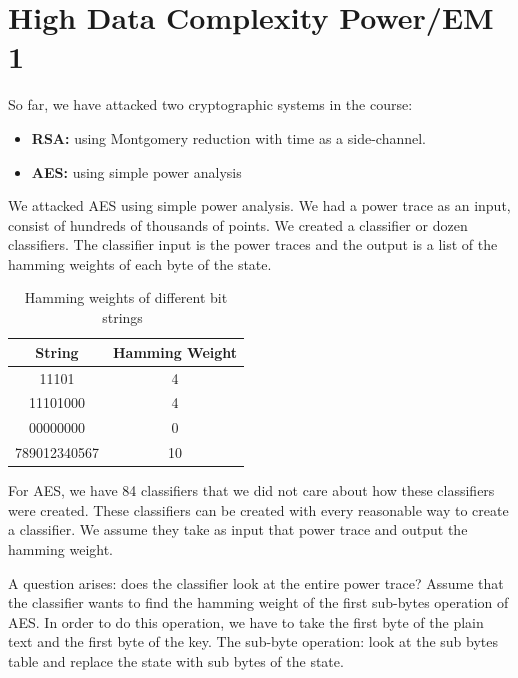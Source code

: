 \chapter{High Data Complexity Power/EM 1} \label{cha:High Data Complexity Power/EM 1}

\newcommand{\hodaya}[1]{{\textcolor{blue}{[Hodaya: #1]}}}

So far, we have attacked two cryptographic systems in the course:
\begin{itemize}
    \item \textbf{RSA:} using Montgomery reduction with time as a side-channel.
    \item \textbf{AES:} using simple power analysis
\end{itemize}

We attacked AES using simple power analysis.
We had a power trace as an input, consist of hundreds of thousands of points.
We created a classifier or dozen classifiers.
The classifier input is the power traces and the output is a list of the hamming weights of each byte of the state.

\begin{table}
    \caption{Hamming weights of different bit strings~\cite{hamming}}\label{hammingWeights}
    \begin{center}
    \begin{tabular}{ cc }
        \toprule
        String & Hamming Weight \\ 
        \midrule
        11101 & 4 \\ 
        11101000 & 4 \\
        00000000 & 0 \\
        789012340567 & 10 \\
        \bottomrule
    \end{tabular}
    \end{center}
\end{table}

For AES, we have 84 classifiers that we did not care about how these classifiers were created.
These classifiers can be created with every reasonable way to create a classifier.
We assume they take as input that power trace and output the hamming weight. 

A question arises: does the classifier look at the entire power trace?
Assume that the classifier wants to find the hamming weight of the first sub-bytes operation of AES.
In order to do this operation, we have to take the first byte of the plain text and the first byte of the key.
The sub-byte operation: look at the sub bytes table and replace the state with sub bytes of the state. 

